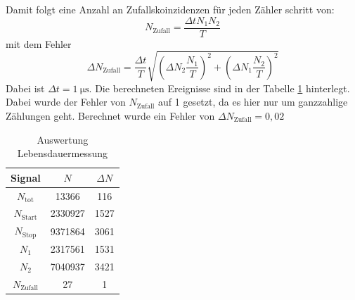 \documentclass{article}
\begin{document}
Damit folgt eine Anzahl an Zufallskoinzidenzen für jeden Zähler schritt von:
\begin{displaymath}
    N_\text{Zufall}=\frac{\Delta t N_1 N_2}{T}
\end{displaymath}
mit dem Fehler
\begin{displaymath}
    \Delta N_\text{Zufall}=\frac{\Delta t}{T}\sqrt{\left( \Delta N_2 \frac{N_1}{T} \right)^2 + \left( \Delta N_1 \frac{N_2}{T} \right)^2}
\end{displaymath}
Dabei ist $\Delta t=\SI{1}{\micro\s}$.
Die berechneten Ereignisse sind in der Tabelle \ref{tab:AuswertungLebensdauer} hinterlegt. Dabei wurde der Fehler von $N_\text{Zufall}$ auf 1 gesetzt, da es hier nur um ganzzahlige Zählungen geht.
Berechnet wurde ein Fehler von $\Delta N_\text{Zufall}=0,02$
\begin{table}[H]
    \centering
    \caption{Auswertung Lebensdauermessung}
    \begin{tabular}{|c|c|c|}
        \hline
        Signal & $N$ & $\Delta N$\\ \hline \hline
        $N_\text{tot}$ & 13366 & 116 \\ \hline
        $N_\text{Start}$ & 2330927 & 1527 \\ \hline
        $N_\text{Stop}$ & 9371864 & 3061 \\ \hline
        $N_1$ & 2317561 & 1531 \\ \hline
        $N_2$ & 7040937 & 3421 \\ \hline
        $N_\text{Zufall}$ & 27 & 1 \\ \hline
    \end{tabular}
    \label{tab:AuswertungLebensdauer}
\end{table}
\end{document}
